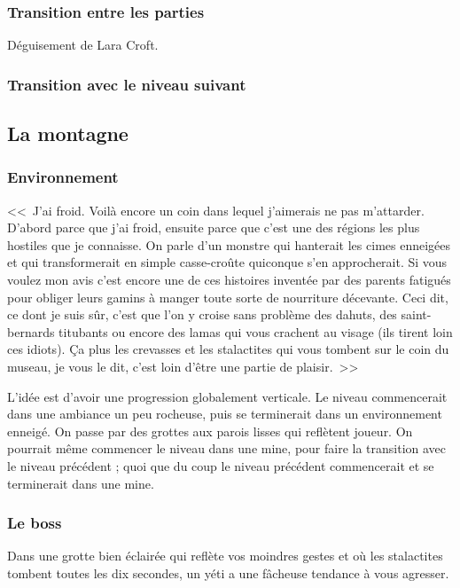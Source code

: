 \documentclass{article}
\begin{document}
\subsubsection{Transition entre les parties}
Déguisement de Lara Croft.

\subsubsection{Transition avec le niveau suivant}

\subsection{La montagne}
\subsubsection{Environnement}
<<~J'ai froid. Voilà encore un coin dans lequel j'aimerais ne pas
m'attarder. D'abord parce que j'ai froid, ensuite parce que c'est une
des régions les plus hostiles que je connaisse. On parle d'un monstre
qui hanterait les cimes enneigées et qui transformerait en simple
casse-croûte quiconque s'en approcherait. Si vous voulez mon avis
c'est encore une de ces histoires inventée par des parents fatigués
pour obliger leurs gamins à manger toute sorte de nourriture
décevante. Ceci dit, ce dont je suis s\^ur, c'est que l'on y croise sans
problème des dahuts, des saint-bernards titubants ou encore des lamas
qui vous crachent au visage (ils tirent loin ces idiots). Ça plus
les crevasses et les stalactites qui vous tombent sur le coin du
museau, je vous le dit, c'est loin d'être une partie de plaisir.~>>

L'idée est d'avoir une progression globalement verticale. Le niveau
commencerait dans une ambiance un peu rocheuse, puis se terminerait
dans un environnement enneigé. On passe par des grottes aux parois
lisses qui reflètent joueur. On pourrait même commencer le niveau dans
une mine, pour faire la transition avec le niveau précédent ; quoi que
du coup le niveau précédent commencerait et se terminerait dans une
mine.

\subsubsection{Le boss}
Dans une grotte bien éclairée qui reflète vos moindres gestes et
où les stalactites tombent toutes les dix secondes, un yéti a 
une fâcheuse tendance à vous agresser.
\end{document}
